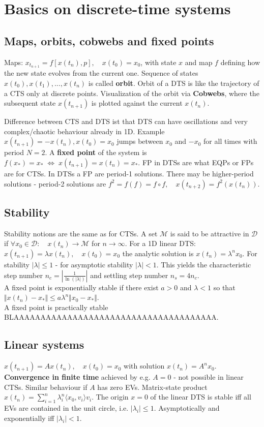 \section{Basics on discrete-time systems}
\subsection{Maps, orbits, cobwebs and fixed points}
Maps: $x_{t_{n+1}}=f[x(t_n),p], \quad x(t_0)=x_0$, with state $x$ and map $f$ defining how the new state evolves from the current one. Sequence of states $x(t_0), x(t_1), ..., x(t_n)$ is called \textbf{orbit}. Orbit of a DTS is like the trajectory of a CTS only at discrete points. Visualization of the orbit via \textbf{Cobwebs}, where the subsequent state $x(t_{n+1})$ is plotted against the current $x(t_n)$.\vspace{0.1cm}

Difference between CTS and DTS ist that DTS can have oscillations and very complex/chaotic behaviour already in 1D. Example $x(t_{n+1})=-x(t_n), x(t_0)=x_0$ jumps between $x_0$ and $-x_0$ for all times with period $N=2$. A \textbf{fixed point} of the system is $f(x_*)=x_* \; \Leftrightarrow \; x(t_{n+1}) = x(t_n) = x_*$. FP in DTSs are what EQPs or FPs are for CTSs. In DTSs a FP are period-1 solutions. There may be higher-period solutions - period-2 solutions are $f^2 = f(f) = f \circ f, \quad x(t_{n+2})=f^2(x(t_n))$.

\subsection{Stability}
Stability notions are the same as for CTSs.
A set $\mathcal{M}$ is said to be attractive in $\mathcal{D}$ if $\forall x_0 \in \mathcal{D}: \quad x(t_n) \rightarrow \mathcal{M}$ for $n\rightarrow \infty$. For a 1D linear DTS: $x(t_{n+1})=\lambda x(t_n), \quad x(t_0)=x_0$ the analytic solution is $x(t_n)=\lambda^n x_0$. For stability $|\lambda|\leq 1$ - for asymptotic stability $|\lambda|<1$. This yields the characteristic step number $n_c=\left|\frac{1}{\ln(|\lambda|)}\right|$ and settling step number $n_s=4n_c$.\\
A fixed point is exponentially stable if there exist $a>0$ and $\lambda<1$ so that $\Vert x(t_n)-x_*\Vert \leq a\lambda^n\Vert x_0 - x_* \Vert$.\\
A fixed point is practically stable BLAAAAAAAAAAAAAAAAAAAAAAAAAAAAAAAAAAAAAA.\\

\subsection{Linear systems}
$x(t_{n+1})=Ax(t_n), \quad x(t_0)=x_0$ with solution $x(t_n)=A^nx_0$. \textbf{Convergence in finite time} achieved by e.g. $A=0$ - not possible in linear CTSs. Similar behaviour if $A$ has zero EVs. Matrix-state product $x(t_n)=\sum_{i=1}^n \lambda_i^n \langle x_0, v_i \rangle v_i$. The origin $x=0$ of the linear DTS is stable iff all EVs are contained in the unit circle, i.e. $|\lambda_i| \leq 1$. Asymptotically and exponentially iff $|\lambda_i|<1$.


